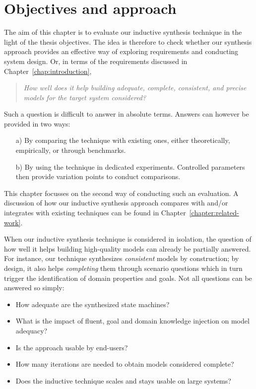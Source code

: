 \section{Objectives and approach\label{section:evaluation-objectives-and-approach}}

The aim of this chapter is to evaluate our inductive synthesis technique in the light of the thesis objectives. The idea is therefore to check whether our synthesis approach provides an effective way of exploring requirements and conducting system design. Or, in terms of the requirements discussed in Chapter~\ref{chap:introduction},

\begin{quotation}
\emph{How well does it help building \emph{adequate}, \emph{complete}, \emph{consistent}, and \emph{precise} models for the target system considered?}
\end{quotation}

Such a question is difficult to answer in absolute terms. Answers can however be provided in two ways:
\begin{enumerate}
\item[a)] By comparing the technique with existing ones, either theoretically, empirically, or through benchmarks.
\item[b)] By using the technique in dedicated experiments. Controlled parameters then provide variation points to conduct comparisons.
\end{enumerate}
This chapter focusses on the second way of conducting such an evaluation. A discussion of how our inductive synthesis approach compares with and/or integrates with existing techniques can be found in Chapter~\ref{chapter:related-work}.

When our inductive synthesis technique is considered in isolation, the question of how well it helps building high-quality models can already be partially answered. For instance, our technique synthesizes \emph{consistent} models by construction; by design, it also helps \emph{completing} them through scenario questions which in turn trigger the identification of domain properties and goals. Not all questions can be answered so simply:
\begin{itemize}
\item How adequate are the synthesized state machines? 
\item What is the impact of fluent, goal and domain knowledge injection on model adequacy?
\item Is the approach usable by end-users? 
\item How many iterations are needed to obtain models considered complete?
\item Does the inductive technique scales and stays usable on large systems?
\end{itemize}

